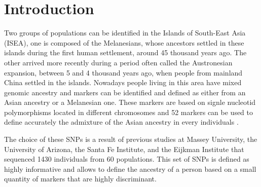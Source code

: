 \documentclass[a4paper,11pt]{report}
\begin{document}

\tableofcontents

\chapter*{Introduction}
Two groups of populations can be identified in the Islands of South-East Asia (ISEA), one is composed of the Melanesians, whose ancestors settled in these islands during the first human settlement, around 45 thousand years ago. The other arrived more recently during a period often called the Austronesian expansion, between 5 and 4 thousand years ago, when people from mainland China settled in the islands. Nowadays people living in this area have mixed genomic ancestry and markers can be identified and defined as either from an Asian ancestry or a Melanesian one. These markers are based on signle nucleotid polymorphisms located in different chromosomes and 52 markers can be used to define accurately the admixture of the Asian ancestry in every individuals \cite{Cox01}.

The choice of these SNPs is a result of previous studies at Massey University, the University of Arizona, the Santa Fe Institute, and the Eijkman Institute that sequenced 1430 individuals from 60 populations. This set of SNPs is defined as highly informative and allows to define the ancestry of a person based on a small quantity of markers that are highly discriminant.
\end{document}

